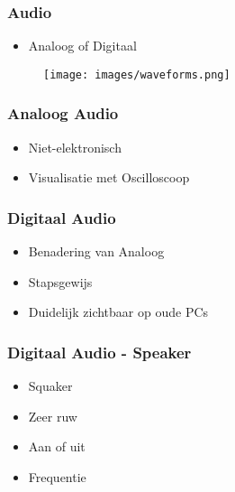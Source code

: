 \begin{frame}
\frametitle{Audio}

\begin{itemize}
\item Analoog of Digitaal
\end{itemize}

\begin{figure}
\texttt{[image: images/waveforms.png]}
\end{figure}

\end{frame}


\begin{frame}
\frametitle{Analoog Audio}

\begin{itemize}
\item Niet-elektronisch
\item Visualisatie met Oscilloscoop
\end{itemize}

\end{frame}


\begin{frame}
\frametitle{Digitaal Audio}

\begin{itemize}
\item Benadering van Analoog
\item Stapsgewijs
\item Duidelijk zichtbaar op oude PCs
\end{itemize}

\end{frame}


\begin{frame}
\frametitle{Digitaal Audio - Speaker}

\begin{itemize}
\item Squaker
\item Zeer ruw
\item Aan of uit
\item Frequentie
\end{itemize}

\end{frame}


